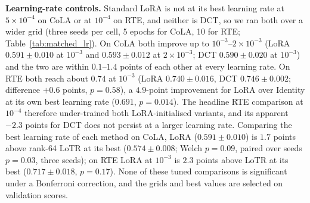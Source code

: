 \documentclass{article}
\theoremstyle{plain}
\begin{document}
\textbf{Learning-rate controls.}
Standard LoRA is not at its best learning rate at $5\times10^{-4}$ on CoLA or at $10^{-4}$ on RTE, and neither is DCT, so we ran both over a wider grid (three seeds per cell, 5 epochs for CoLA, 10 for RTE; Table~\ref{tab:matched_lr}).
On CoLA both improve up to $10^{-3}$--$2\times10^{-3}$ (LoRA $0.591\pm0.010$ at $10^{-3}$ and $0.593\pm0.012$ at $2\times10^{-3}$; DCT $0.590\pm0.020$ at $10^{-3}$) and the two are within $0.1$--$1.4$ points of each other at every learning rate.
On RTE both reach about $0.74$ at $10^{-3}$ (LoRA $0.740\pm0.016$, DCT $0.746\pm0.002$; difference $+0.6$ points, $p=0.58$), a $4.9$-point improvement for LoRA over Identity at its own best learning rate ($0.691$, $p=0.014$).
The headline RTE comparison at $10^{-4}$ therefore under-trained both LoRA-initialised variants, and its apparent $-2.3$ points for DCT does not persist at a larger learning rate.
Comparing the best learning rate of each method on CoLA, LoRA ($0.591\pm0.010$) is $1.7$ points above rank-64 LoTR at its best ($0.574\pm0.008$; Welch $p=0.09$, paired over seeds $p=0.03$, three seeds); on RTE LoRA at $10^{-3}$ is $2.3$ points above LoTR at its best ($0.717\pm0.018$, $p=0.17$).
None of these tuned comparisons is significant under a Bonferroni correction, and the grids and best values are selected on validation scores.
\end{document}
